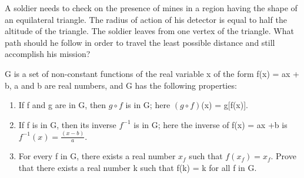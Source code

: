 \item A soldier needs to check on the presence of mines in a region having the shape of an equilateral triangle. The radius of action of his detector is equal to half the altitude of the triangle. The soldier leaves from one vertex of the triangle. What path should he follow in order to travel the least possible distance and still accomplish his mission?\\

\item G is a set of non-constant functions of the real variable x of the form f(x) = ax + b, a and b are real numbers, and G has the following properties:
\begin{enumerate}
\item If f and g are in G, then $g \circ f$ is in G; here $(g \circ f)$(x) = g[f(x)].
\item If f is in G, then its inverse $f^{-1}$ is in G; here the inverse of f(x) = ax +b
is $f^{-1}(x) = \frac{(x-b)}{a}.$
\item For every f in G, there exists a real number $x_f$ such that $f(x_f) = x_f.$
Prove that there exists a real number k such that f(k) = k for all f in G.
\end{enumerate}

